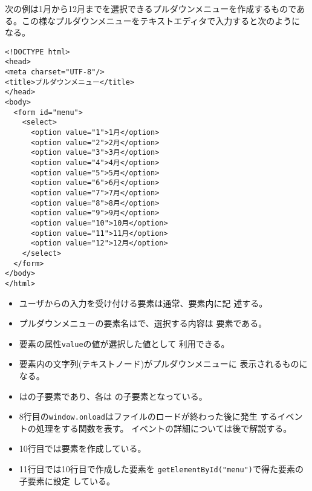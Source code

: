 \begin{Exec}\upshape\label{PullDown}
 次の例は1月から12月までを選択できるプルダウンメニューを作成するものであ
 る。この様なプルダウンメニューをテキストエディタで入力すると次のように
 なる。\label{pulldown1}
\begin{Verbatim}
<!DOCTYPE html>
<head>
<meta charset="UTF-8"/>
<title>プルダウンメニュー</title>
</head>
<body>
  <form id="menu">
    <select>
      <option value="1">1月</option>
      <option value="2">2月</option>
      <option value="3">3月</option>
      <option value="4">4月</option>
      <option value="5">5月</option>
      <option value="6">6月</option>
      <option value="7">7月</option>
      <option value="8">8月</option>
      <option value="9">9月</option>
      <option value="10">10月</option>
      <option value="11">11月</option>
      <option value="12">12月</option>
    </select>
  </form>
</body>
</html>
\end{Verbatim}
\begin{itemize}
 \item ユーザからの入力を受け付ける要素は通常、要素内に記
       述する。
 \item プルダウンメニュ－の要素名はで、選択する内容は
       要素である。
 \item {}要素の属性\texttt{value}の値が選択した値として
       利用できる。
 \item {}要素内の文字列(テキストノード)がプルダウンメニューに
       表示されるものになる。
 \item {}はの子要素であり、各は
       の子要素となっている。
\end{itemize}
\label{pulldown2}
\begin{itemize}
 \item 8行目の\texttt{window.onload}はファイルのロードが終わった後に発生
       するイベントの処理をする関数を表す。
       イベントの詳細については後で解説する。
 \item 10行目では要素を作成している。
 \item 11行目では10行目で作成した要素を
       \texttt{getElementById("menu")}で得た要素の子要素に設定
       している。 

\end{itemize}
\end{Exec}
